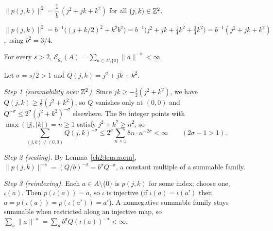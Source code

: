 \begin{lemma}\label{ch2:lem:norm}
$\|p(j,k)\|^2=\dfrac1b\,(j^2+jk+k^2)$ for all $(j,k)\in\mathbb{Z}^2$.
\end{lemma}

\begin{humanproof}
$\|p(j,k)\|^2=b^{-1}\bigl((j+k/2)^2+k^2b^2\bigr)=b^{-1}\bigl(j^2+jk+\tfrac14k^2+\tfrac34k^2\bigr)=b^{-1}(j^2+jk+k^2)$,
using $b^2=3/4$.
\end{humanproof}

\begin{theorem}[D1b]\label{ch2:thm:d1b}
For every $s>2$, $\mathcal{E}_{g_s}(A)=\sum_{a\in A\setminus\{0\}}\|a\|^{-s}<\infty$.
\end{theorem}

\begin{humanproof}
Let $\sigma=s/2>1$ and $Q(j,k)=j^2+jk+k^2$.

\emph{Step 1 (summability over $\mathbb{Z}^2$).} Since $jk\ge-\tfrac12(j^2+k^2)$, we have $Q(j,k)\ge\tfrac12(j^2+k^2)$, so $Q$
vanishes only at $(0,0)$ and $Q^{-\sigma}\le2^\sigma(j^2+k^2)^{-\sigma}$ elsewhere. The $8n$ integer points with
$\max(|j|,|k|)=n\ge1$ satisfy $j^2+k^2\ge n^2$, so
\[
\sum_{(j,k)\neq(0,0)}Q(j,k)^{-\sigma}\le2^\sigma\sum_{n\ge1}8n\cdot n^{-2\sigma}<\infty\qquad(2\sigma-1>1).
\]

\emph{Step 2 (scaling).} By Lemma~\ref{ch2:lem:norm}, $\|p(j,k)\|^{-s}=(Q/b)^{-\sigma}=b^{\sigma}Q^{-\sigma}$, a constant
multiple of a summable family.

\emph{Step 3 (reindexing).} Each $a\in A\setminus\{0\}$ is $p(j,k)$ for some index; choose one, $\iota(a)$. Then
$p(\iota(a))=a$, so $\iota$ is injective (if $\iota(a)=\iota(a')$ then $a=p(\iota(a))=p(\iota(a'))=a'$). A nonnegative
summable family stays summable when restricted along an injective map, so $\sum_{a}\|a\|^{-s}=\sum_a
b^\sigma Q(\iota(a))^{-\sigma}<\infty$.
\end{humanproof}

